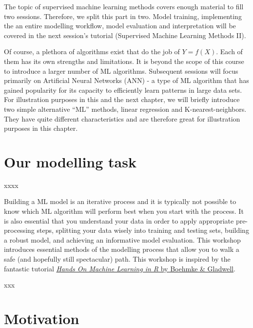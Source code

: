 \documentclass[
]{book}
\begin{document}
The topic of supervised machine learning methods covers enough material to fill two sessions. Therefore, we split this part in two. Model training, implementing the an entire modelling workflow, model evaluation and interpretation will be covered in the next session's tutorial (Supervised Machine Learning Methods II).

Of course, a plethora of algorithms exist that do the job of \(Y = f(X)\). Each of them has its own strengths and limitations. It is beyond the scope of this course to introduce a larger number of ML algorithms. Subsequent sessions will focus primarily on Artificial Neural Networks (ANN) - a type of ML algorithm that has gained popularity for its capacity to efficiently learn patterns in large data sets. For illustration purposes in this and the next chapter, we will briefly introduce two simple alternative ``ML'' methods, linear regression and K-nearest-neighbors. They have quite different characteristics and are therefore great for illustration purposes in this chapter.

\hypertarget{our-modelling-task}{%
\section{Our modelling task}\label{our-modelling-task}}

xxxx

Building a ML model is an iterative process and it is typically not possible to know which ML algorithm will perform best when you start with the process. It is also essential that you understand your data in order to apply appropriate pre-processing steps, splitting your data wisely into training and testing sets, building a robust model, and achieving an informative model evaluation. This workshop introduces essential methods of the modelling process that allow you to walk a safe (and hopefully still spectacular) path. This workshop is inspired by the fantastic tutorial \href{https://bradleyboehmke.github.io/HOML}{\emph{Hands On Machine Learning in R} by Boehmke \& Gladwell}.

xxx

\hypertarget{motivation-1}{%
\section{Motivation}\label{motivation-1}}
\end{document}
